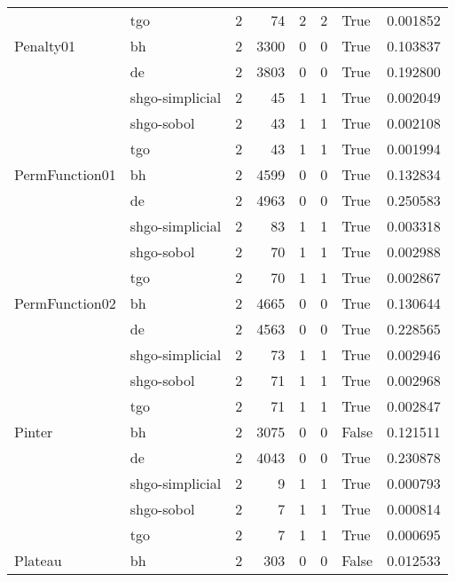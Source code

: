 \begin{longtable}{llrrrrlr}
         & tgo &     2 &       74 &      2 &       2 &    True &    0.001852 \\
Penalty01 & bh &     2 &     3300 &      0 &       0 &    True &    0.103837 \\
         & de &     2 &     3803 &      0 &       0 &    True &    0.192800 \\
         & shgo-simplicial &     2 &       45 &      1 &       1 &    True &    0.002049 \\
         & shgo-sobol &     2 &       43 &      1 &       1 &    True &    0.002108 \\
         & tgo &     2 &       43 &      1 &       1 &    True &    0.001994 \\
PermFunction01 & bh &     2 &     4599 &      0 &       0 &    True &    0.132834 \\
         & de &     2 &     4963 &      0 &       0 &    True &    0.250583 \\
         & shgo-simplicial &     2 &       83 &      1 &       1 &    True &    0.003318 \\
         & shgo-sobol &     2 &       70 &      1 &       1 &    True &    0.002988 \\
         & tgo &     2 &       70 &      1 &       1 &    True &    0.002867 \\
PermFunction02 & bh &     2 &     4665 &      0 &       0 &    True &    0.130644 \\
         & de &     2 &     4563 &      0 &       0 &    True &    0.228565 \\
         & shgo-simplicial &     2 &       73 &      1 &       1 &    True &    0.002946 \\
         & shgo-sobol &     2 &       71 &      1 &       1 &    True &    0.002968 \\
         & tgo &     2 &       71 &      1 &       1 &    True &    0.002847 \\
Pinter & bh &     2 &     3075 &      0 &       0 &   False &    0.121511 \\
         & de &     2 &     4043 &      0 &       0 &    True &    0.230878 \\
         & shgo-simplicial &     2 &        9 &      1 &       1 &    True &    0.000793 \\
         & shgo-sobol &     2 &        7 &      1 &       1 &    True &    0.000814 \\
         & tgo &     2 &        7 &      1 &       1 &    True &    0.000695 \\
Plateau & bh &     2 &      303 &      0 &       0 &   False &    0.012533 \\

\end{longtable}
